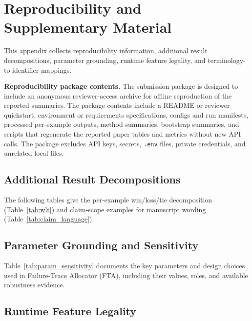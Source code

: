 \appendix
\section{Reproducibility and Supplementary Material}
\label{sec:appendix_repro}
This appendix collects reproducibility information, additional result decompositions,
parameter grounding, runtime feature legality, and terminology-to-identifier mappings.



\medskip\noindent\textbf{Reproducibility package contents.}
The submission package is designed to include an anonymous reviewer-access archive
for offline reproduction of the reported summaries. The package contents include
a README or reviewer quickstart, environment or requirements specifications,
configs and run manifests, processed per-example outputs, method summaries,
bootstrap summaries, and scripts that regenerate the reported paper tables and
metrics without new API calls. The package excludes API keys, secrets, \texttt{.env}
files, private credentials, and unrelated local files.

\clearpage
\subsection*{Additional Result Decompositions}

The following tables give the per-example win/loss/tie decomposition
(Table~\ref{tab:wlt}) and claim-scope examples for manuscript wording
(Table~\ref{tab:claim_language}).




\clearpage
\subsection*{Parameter Grounding and Sensitivity}

Table~\ref{tab:param_sensitivity} documents the key parameters and design choices
used in Failure-Trace Allocator (FTA), including their values, roles, and available robustness evidence.



\clearpage
\subsection*{Runtime Feature Legality}

